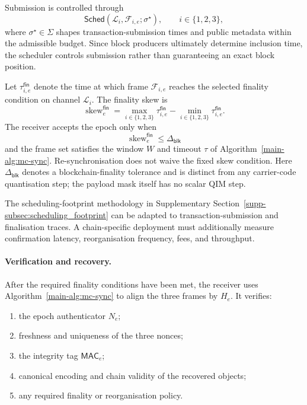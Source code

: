 \documentclass[journal]{IEEEtran}
\theoremstyle{definition}
\theoremstyle{game}
\begin{document}
Submission is controlled through
\begin{equation}
\mathsf{Sched}
\left(
\mathcal{L}_i,
\mathcal{F}_{i,e};
\sigma^\star
\right),
\qquad
i\in\{1,2,3\},
\end{equation}
where $\sigma^\star\in\Sigma$ shapes transaction-submission
times and public metadata within the admissible budget. Since
block producers ultimately determine inclusion time, the
scheduler controls submission rather than guaranteeing an exact
block position.

Let
$\tau^{\mathsf{fin}}_{i,e}$ denote the time at which frame
$\mathcal{F}_{i,e}$ reaches the selected finality condition on
channel $\mathcal{L}_i$. The finality skew is
\begin{equation}
\label{eq:blockchain_finality_skew}
\operatorname{skew}^{\mathsf{fin}}_e
=
\max_{i\in\{1,2,3\}}
\tau^{\mathsf{fin}}_{i,e}
-
\min_{i\in\{1,2,3\}}
\tau^{\mathsf{fin}}_{i,e}.
\end{equation}
The receiver accepts the epoch only when
\begin{equation}
\label{eq:blockchain_finality_bound}
\operatorname{skew}^{\mathsf{fin}}_e
\leq
\Delta_{\mathsf{blk}}
\end{equation}
and the frame set satisfies the window $W$ and timeout $\tau$ of
Algorithm~\ref{main-alg:mc-sync}. Re-synchronisation does not waive the
fixed skew condition. Here
$\Delta_{\mathsf{blk}}$ denotes a blockchain-finality tolerance
and is distinct from any carrier-code quantisation step; the payload
mask itself has no scalar QIM step.

The scheduling-footprint methodology in Supplementary
Section~\ref{supp-subsec:scheduling_footprint} can be adapted to
transaction-submission and finalisation traces. A chain-specific
deployment must additionally measure confirmation latency,
reorganisation frequency, fees, and throughput.

\paragraph{Verification and recovery.}
After the required finality conditions have been met, the receiver
uses Algorithm~\ref{main-alg:mc-sync} to align the three frames by
$H_e$. It verifies:

\begin{enumerate}
\item the epoch authenticator $N_e$;
\item freshness and uniqueness of the three nonces;
\item the integrity tag $\mathsf{MAC}_e$;
\item canonical encoding and chain validity of the recovered
      objects;
\item any required finality or reorganisation policy.
\end{enumerate}
\end{document}
